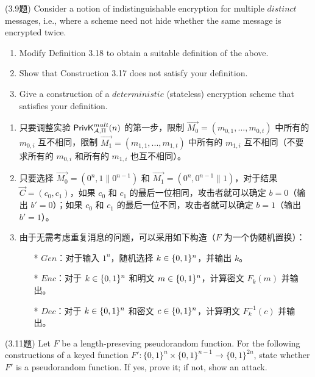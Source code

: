 \begin{questions}
    \question (3.9题) Consider a notion of indistinguishable encryption for multiple $distinct$ messages, i.e., where a scheme need not hide whether the same message is encrypted twice.

        \begin{enumerate}
            \item Modify Definition 3.18 to obtain a suitable definition of the above.
            \item Show that Construction 3.17 does not satisfy your definition.
            \item Give a construction of a $deterministic$ (stateless) encryption scheme that satisfies your definition.
        \end{enumerate}

        \begin{solution}
            \begin{enumerate}
                \item 只要调整实验 $\mathsf{PrivK}^{mult}_{\mathcal{A},\Pi}(n)$ 的第一步，限制 $\vec{M_0}=(m_{0,1},...,m_{0,t})$ 中所有的 $m_{0,i}$ 互不相同，限制 $\vec{M_1}=(m_{1,1},...,m_{1,t})$ 中所有的 $m_{1,i}$ 互不相同（不要求所有的 $m_{0,i}$ 和所有的 $m_{1,i}$ 也互不相同）。
                \item 只要选择 $\vec{M_0}=(0^n,1\parallel0^{n-1})$ 和 $\vec{M_1}=(0^n,0^{n-1}\parallel1)$，对于结果 $\vec{C}=(c_0,c_1)$，如果 $c_0$ 和 $c_1$ 的最后一位相同，攻击者就可以确定 $b=0$（输出 $b'=0$）；如果 $c_0$ 和 $c_1$ 的最后一位不同，攻击者就可以确定 $b=1$（输出 $b'=1$）。
                \item 由于无需考虑重复消息的问题，可以采用如下构造（$F$ 为一个伪随机置换）：
                    \begin{enumerate}
                        \item[*] $Gen$：对于输入 $1^n$，随机选择 $k\in\{{0,1}\}^n$，并输出 $k$。
                        \item[*] $Enc$：对于 $k\in\{{0,1}\}^n$ 和明文 $m\in\{{0,1}\}^n$，计算密文 $F_k(m)$ 并输出。
                        \item[*] $Dec$：对于 $k\in\{{0,1}\}^n$ 和密文 $c\in\{{0,1}\}^n$，计算明文 $F_k^{-1}(c)$ 并输出。
                    \end{enumerate}
            \end{enumerate}
        \end{solution}

    \question (3.11题) Let $F$ be a length-preseving pseudorandom function. For the following constructions of a keyed function $F':\{0,1\}^n\times\{0,1\}^{n-1}\rightarrow\{0,1\}^{2n}$, state whether $F'$ is a pseudorandom function. If yes, prove it; if not, show an attack.


\end{questions}
